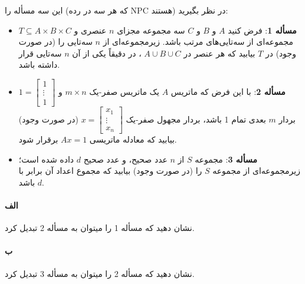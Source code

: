 \documentclass[]{article}
\begin{document}
این سه مسأله را (که هر سه در رده NPC هستند) در نظر بگیرید:
\begin{itemize}
    \item \textbf{مسأله 1}:
    فرض کنید $A$ و $B$ و $C$ 
    سه مجموعه مجزای $n$ عنصری
    و $T \subseteq A \times B \times C$
    مجموعه‌ای از سه‌تایی‌های مرتب باشد.
    زیرمجموعه‌ای از $n$ سه‌تایی را
    (در صورت وجود) در $T$ بیابید
    که هر عنصر در $A \cup B \cup C$ ،
    در  دقیقاً یکی از آن $n$ سه‌تایی قرار داشته باشد.

    \item \textbf{مسأله 2}:
    با این فرض که ماتریس $A$
    یک ماتریس صفر-یک $m \times n$ و
    $
    1 = 
    \left[
    \begin{matrix}
        1 \\
        \vdots \\
        1
    \end{matrix}  
    \right]
    $
    بردار $m$ بعدی تمام 1 باشد،
    بردار مجهول صفر-یک
    $
    x = 
    \left[
    \begin{matrix}
        x_1 \\
        \vdots \\
        x_n
    \end{matrix}  
    \right]
    $
    (در صورت وجود)
    بیابید که معادله ماتریسی $Ax = 1$ برقرار شود.

    \item \textbf{مسأله 3}:
    مجموعه $S$ از $n$ عدد صحیح،
    و عدد صحیح $d$ داده شده است؛
    زیرمجموعه‌ای از مجموعه $S$ را
    (در صورت وجود) بیابید که مجموع اعداد آن برابر با $d$ باشد.
\end{itemize}
\paragraph*{الف}
نشان دهید که مسأله 1 را میتوان به مسأله 2 تبدیل کرد.
\paragraph*{ب}
نشان دهید که مسأله 2 را میتوان به مسأله 3 تبدیل کرد.
\end{document}
